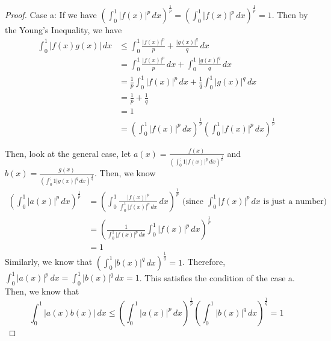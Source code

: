 \begin{answer}
    \begin{proof}
        Case a: If we have $(\int_0^1\lvert f(x) \rvert^p \, dx)^{\frac{1}{p}} = (\int_0^1\lvert f(x) \rvert^p \, dx)^{\frac{1}{p}} = 1$. Then by the Young's Inequality, we have 
        \begin{equation}
            \begin{aligned}
                \int_0^1 \lvert f(x)g(x) \rvert \,dx &\leq \int_0^1 \tfrac{\lvert f(x) \rvert^p}{p} + \tfrac{\lvert g(x) \rvert^q}{q} \,dx\\
                &= \int_0^1 \tfrac{\lvert f(x) \rvert^p}{p} \,dx + \int_0^1 \tfrac{\lvert g(x) \rvert^q}{q} \,dx\\
                &= \tfrac{1}{p}\int_0^1 \lvert f(x) \rvert^p \, dx + \tfrac{1}{q}\int_0^1\lvert g(x) \rvert^q \,dx\\
                &= \tfrac{1}{p} + \tfrac{1}{q}\\
                &= 1\\
                &= \left(\int_0^1\lvert f(x) \rvert^p \, dx\right)^{\frac{1}{p}}\left(\int_0^1\lvert f(x) \rvert^p \, dx\right)^{\frac{1}{p}}
            \end{aligned}
        \end{equation}
        
        Then, look at the general case, let $a(x) = \tfrac{f(x)}{(\int_0^;1\lvert f(x) \rvert^p \, dx)^{\frac{1}{p}}}$ and $b(x) = \tfrac{g(x)}{(\int_0^;1\lvert g(x) \rvert^q \, dx)^{\frac{1}{q}}}$. Then, we know
        \begin{equation}
            \begin{aligned}
                \left(\int_0^1 \lvert a(x) \rvert^p \, dx\right)^{\frac{1}{p}} &= \left(\int_0^1 \tfrac{\lvert f(x) \rvert^p}{\int_0^1 \lvert f(x) \rvert^p \,dx}\,dx\right)^{\frac{1}{p}} \text{ (since $\int_0^1 \lvert f(x) \rvert^p \,dx$ is just a number)}\\
                &= \left(\tfrac{1}{\int_0^1\lvert f(x) \rvert^p \,dx}\int_0^1 \lvert f(x) \rvert^p \,dx\right)^{\frac{1}{p}}\\
                &= 1
            \end{aligned}
        \end{equation}
        Similarly, we know that $(\int_0^1 \lvert b(x) \rvert^q \, dx)^{\frac{1}{q}} = 1$. Therefore, $\int_0^1 \lvert a(x) \rvert^p \, dx= \int_0^1 \lvert b(x) \rvert^q \, dx = 1$. This satisfies the condition of the case a. Then, we know that
        \begin{equation}
            \int_0^1 \lvert a(x)b(x) \rvert \,dx \leq \left(\int_0^1 \lvert a(x) \rvert^p \, dx\right)^{\frac{1}{p}} \left(\int_0^1 \lvert b(x) \rvert^q \, dx\right)^{\frac{1}{q}} = 1
        \end{equation}
        

\end{proof}
\end{answer}
